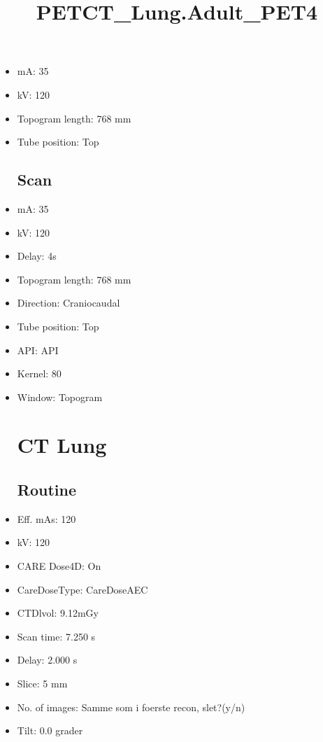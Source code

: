 \documentclass[12pt]{article}
\title{PETCT\_Lung.Adult\_PET4}
\begin{document}
\maketitle
\newpage
\tableofcontents
\newpage
{}


\begin{itemize}\section{Topogram}
\subsection{Routine}
\item mA: 35\item kV: 120\item Topogram length: 768 mm\item Tube position: Top
\subsection{Scan}\item mA: 35\item kV: 120\item Delay: 4s\item Topogram length: 768 mm\item Direction: Craniocaudal\item Tube position: Top\item API: API \item Kernel: 80\item Window: Topogram
\section{CT Lung}
\subsection{Routine}
\item Eff. mAs: 120\item kV: 120\item CARE Dose4D: On\item CareDoseType: CareDoseAEC\item CTDlvol: 9.12mGy\item Scan time: 7.250 s\item Delay: 2.000 s\item Slice: 5 mm\item No. of images: Samme som i foerste recon, slet?(y/n)\item Tilt: 0.0 grader

\end{itemize}
\end{document}
